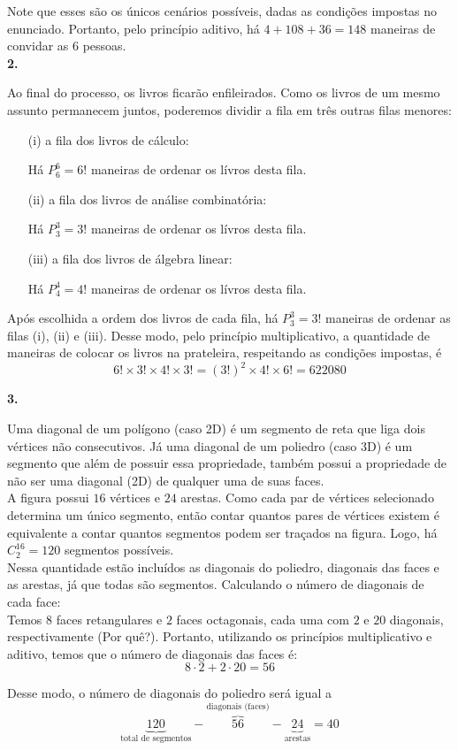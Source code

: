 \documentclass[12pt, a4paper]{article}
\begin{document}
Note que esses são os únicos cenários possíveis, dadas as condições impostas no enunciado. Portanto, pelo princípio aditivo, há \(4 + 108+36=148\) maneiras de convidar as \(6\) pessoas. \\

\textbf{2.}

Ao final do processo, os livros ficarão enfileirados. Como os livros de um mesmo assunto permanecem juntos, poderemos dividir a fila em três outras filas menores: 

\begin{enumerate}
\item[(i)] a fila dos livros de cálculo:

Há \(P^6_6 = 6!\) maneiras de ordenar os lívros desta fila.

\item[(ii)] a fila dos livros de análise combinatória:

Há \(P^3_3 = 3!\) maneiras de ordenar os lívros desta fila.

\item[(iii)] a fila dos livros de álgebra linear:

Há \(P^4_4 = 4!\) maneiras de ordenar os lívros desta fila.

\end{enumerate}

Após escolhida a ordem dos livros de cada fila, há \(P^3_3 = 3!\) maneiras de ordenar as filas (i), (ii) e (iii). Desse modo, pelo princípio multiplicativo, a quantidade de maneiras de colocar os livros na prateleira, respeitando as condições impostas, é \[6!\times3!\times4!\times3!=\left(3! \right)^2 \times 4! \times 6! = 622080\]
 
\textbf{3.}

Uma diagonal de um polígono (caso 2D) é um segmento de reta que liga dois vértices não consecutivos. Já uma diagonal de um poliedro (caso 3D) é um segmento que além de possuir essa propriedade, também possui a propriedade de não ser uma diagonal (2D) de qualquer uma de suas faces. \\

A figura possui \(16\) vértices e \(24\) arestas. Como cada par de vértices selecionado determina um único segmento, então contar quantos pares de vértices existem é equivalente a contar quantos segmentos podem ser traçados na figura. Logo, há \(C^{16}_2 = 120\) segmentos possíveis. \\

Nessa quantidade estão incluídos as diagonais do poliedro, diagonais das faces e as arestas, já que todas são segmentos. Calculando o número de diagonais de cada face: \\

Temos \(8\) faces retangulares e \(2\) faces octagonais, cada uma com \(2\) e \(20\) diagonais, respectivamente (Por quê?). Portanto, utilizando os princípios multiplicativo e aditivo, temos que o número de diagonais das faces é: \[8\cdot{2} + 2\cdot{20}=56\]

Desse modo, o número de diagonais do poliedro será igual a \[\underbrace{120}_{\text{total de segmentos}} - \overbrace{56}^{\text{diagonais (faces)}} - \underbrace{24}_{\text{arestas}} = 40\]
\end{document}
